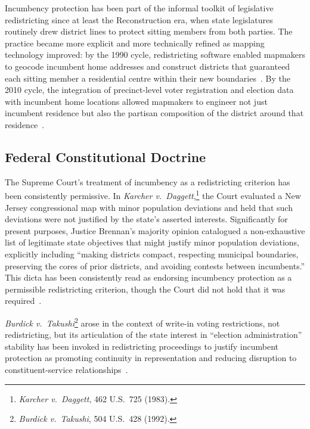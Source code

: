 \label{sec:background}

Incumbency protection has been part of the informal toolkit of legislative redistricting
since at least the Reconstruction era, when state legislatures routinely drew district
lines to protect sitting members from both parties. The practice became more explicit
and more technically refined as mapping technology improved: by the 1990 cycle,
redistricting software enabled mapmakers to geocode incumbent home addresses and
construct districts that guaranteed each sitting member a residential centre within
their new boundaries~\citep{altman2011public}. By the 2010 cycle, the integration of
precinct-level voter registration and election data with incumbent home locations
allowed mapmakers to engineer not just incumbent residence but also the partisan
composition of the district around that residence~\citep{mcghee2014measuring}.

\subsection{Federal Constitutional Doctrine}

The Supreme Court's treatment of incumbency as a redistricting criterion has been
consistently permissive. In \textit{Karcher v.\ Daggett},\footnote{\textit{Karcher
v.\ Daggett}, 462 U.S.\ 725 (1983).} the Court evaluated a New Jersey congressional
map with minor population deviations and held that such deviations were not justified
by the state's asserted interests. Significantly for present purposes, Justice Brennan's
majority opinion catalogued a non-exhaustive list of legitimate state objectives that
might justify minor population deviations, explicitly including ``making districts
compact, respecting municipal boundaries, preserving the cores of prior districts, and
avoiding contests between incumbents.'' This dicta has been consistently read as
endorsing incumbency protection as a permissible redistricting criterion, though the
Court did not hold that it was required~\citep{karcher1983}.

\textit{Burdick v.\ Takushi}\footnote{\textit{Burdick v.\ Takushi}, 504 U.S.\ 428
(1992).} arose in the context of write-in voting restrictions, not redistricting, but
its articulation of the state interest in ``election administration'' stability has
been invoked in redistricting proceedings to justify incumbent protection as promoting
continuity in representation and reducing disruption to constituent-service
relationships~\citep{burdick1992}.

